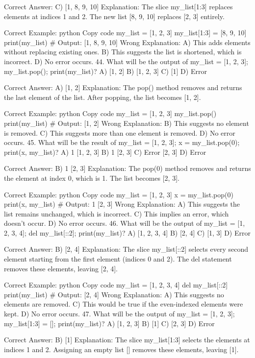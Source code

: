 Correct Answer: C) [1, 8, 9, 10]
Explanation: The slice my_list[1:3] replaces elements at indices 1 and 2. The new list [8, 9, 10] replaces [2, 3] entirely.

Correct Example:
python
Copy code
my_list = [1, 2, 3]
my_list[1:3] = [8, 9, 10]
print(my_list)  # Output: [1, 8, 9, 10]
Wrong Explanation:
A) This adds elements without replacing existing ones.
B) This suggests the list is shortened, which is incorrect.
D) No error occurs.
44. What will be the output of my_list = [1, 2, 3]; my_list.pop(); print(my_list)?
A) [1, 2]
B) [1, 2, 3]
C) [1]
D) Error

Correct Answer: A) [1, 2]
Explanation: The pop() method removes and returns the last element of the list. After popping, the list becomes [1, 2].

Correct Example:
python
Copy code
my_list = [1, 2, 3]
my_list.pop()
print(my_list)  # Output: [1, 2]
Wrong Explanation:
B) This suggests no element is removed.
C) This suggests more than one element is removed.
D) No error occurs.
45. What will be the result of my_list = [1, 2, 3]; x = my_list.pop(0); print(x, my_list)?
A) 1 [1, 2, 3]
B) 1 [2, 3]
C) Error [2, 3]
D) Error

Correct Answer: B) 1 [2, 3]
Explanation: The pop(0) method removes and returns the element at index 0, which is 1. The list becomes [2, 3].

Correct Example:
python
Copy code
my_list = [1, 2, 3]
x = my_list.pop(0)
print(x, my_list)  # Output: 1 [2, 3]
Wrong Explanation:
A) This suggests the list remains unchanged, which is incorrect.
C) This implies an error, which doesn't occur.
D) No error occurs.
46. What will be the output of my_list = [1, 2, 3, 4]; del my_list[::2]; print(my_list)?
A) [1, 2, 3, 4]
B) [2, 4]
C) [1, 3]
D) Error

Correct Answer: B) [2, 4]
Explanation: The slice my_list[::2] selects every second element starting from the first element (indices 0 and 2). The del statement removes these elements, leaving [2, 4].

Correct Example:
python
Copy code
my_list = [1, 2, 3, 4]
del my_list[::2]
print(my_list)  # Output: [2, 4]
Wrong Explanation:
A) This suggests no elements are removed.
C) This would be true if the even-indexed elements were kept.
D) No error occurs.
47. What will be the output of my_list = [1, 2, 3]; my_list[1:3] = []; print(my_list)?
A) [1, 2, 3]
B) [1]
C) [2, 3]
D) Error

Correct Answer: B) [1]
Explanation: The slice my_list[1:3] selects the elements at indices 1 and 2. Assigning an empty list [] removes these elements, leaving [1].

